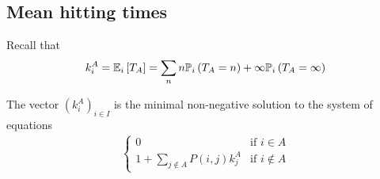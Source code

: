 \subsection{Mean hitting times}
Recall that
\begin{align*}
	k_i^A = \mathbb{E}_{i}\left[{T_A}\right] = \sum_n n \mathbb{P}_{i}\left({T_A = n}\right) + \infty \mathbb{P}_{i}\left({T_A = \infty}\right)
\end{align*}
\begin{theorem}
	The vector $(k_i^A)_{i \in I}$ is the minimal non-negative solution to the system of equations
	\begin{align*}
		\begin{cases}
			0                                   & \text{if } i \in A     \\
			1 + \sum_{j \not\in A} P(i,j) k_j^A & \text{if } i \not\in A
		\end{cases}
	\end{align*}
\end{theorem}
